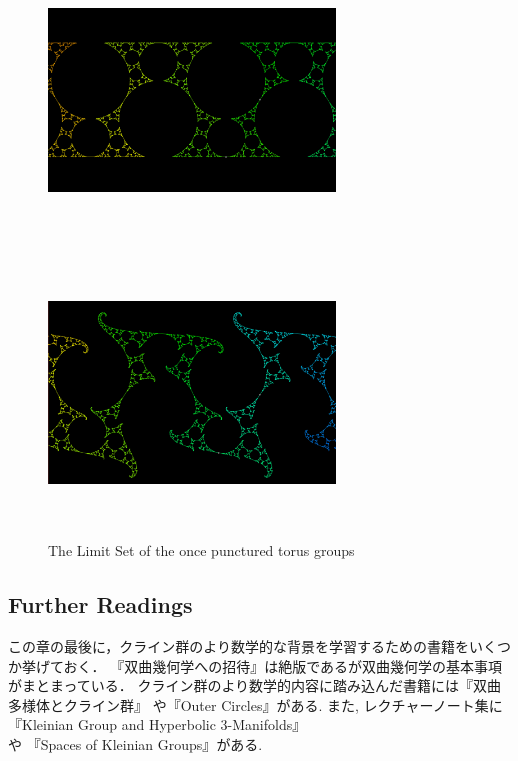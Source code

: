  \begin{figure}[htbp]
  \begin{minipage}{0.5\hsize}
   \center
   \includegraphics[width=3in, height=3in,
   keepaspectratio]{../img/klein/opt1N.pdf}
   \subcaption{}
  \end{minipage}
  \begin{minipage}{0.5\hsize}
   \center
   \includegraphics[width=3in, height=3in,
   keepaspectratio]{../img/klein/opt2N.pdf}
   \subcaption{}
  \end{minipage}
  \caption{The Limit Set of the once punctured torus groups}
  \label{fig:opt}
 \end{figure}

\subsection{Further Readings}
この章の最後に，クライン群のより数学的な背景を学習するための書籍をいくつか挙げておく．
『双曲幾何学への招待』\cite{invitation}は絶版であるが双曲幾何学の基本事項がまとまっている．
クライン群のより数学的内容に踏み込んだ書籍には『双曲多様体とクライン群』
\cite{manifold}や『Outer Circles』\cite{outerCircles}がある.
また, レクチャーノート集に『Kleinian Group and Hyperbolic 3-Manifolds』\cite{kleinianGroupsAndHyperbolic3-Manifolds}や
『Spaces of Kleinian Groups』\cite{space}がある.

\clearpage
